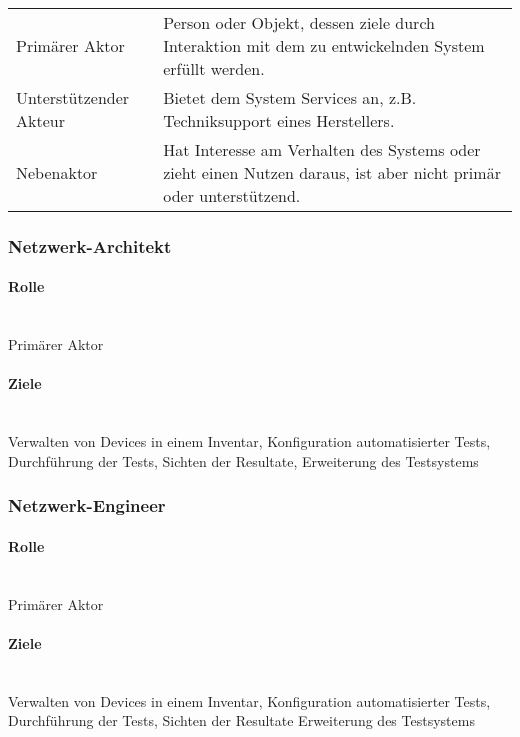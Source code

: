 \documentclass[
	ngerman,
	toc=listof, %
	toc=bibliography, %
	footnotes=multiple, %
	parskip=half, %
	numbers=noendperiod %
]{scrartcl}
\begin{document}
		\begin{tabularx}{\textwidth}{lX}
			\toprule
				Primärer Aktor & Person oder Objekt, dessen ziele durch Interaktion mit dem zu entwickelnden System erfüllt werden.\\
				Unterstützender Akteur & Bietet dem System Services an, z.B. Techniksupport eines Herstellers.\\
				Nebenaktor & Hat Interesse am Verhalten des Systems oder zieht einen Nutzen daraus, ist aber nicht primär oder unterstützend. \\
			\bottomrule
		\end{tabularx}

		\subsubsection{Netzwerk-Architekt}
		
			\paragraph{Rolle} ~\\
			Primärer Aktor 

			\paragraph{Ziele} ~\\
			Verwalten von Devices in einem Inventar, 
			Konfiguration automatisierter Tests, 
			Durchführung der Tests, 
			Sichten der Resultate,
			Erweiterung des Testsystems
			
		\subsubsection{Netzwerk-Engineer}
		
			\paragraph{Rolle} ~\\
			Primärer Aktor 

			\paragraph{Ziele} ~\\
			Verwalten von Devices in einem Inventar, 
			Konfiguration automatisierter Tests, 
			Durchführung der Tests, 
			Sichten der Resultate
			Erweiterung des Testsystems
			\newpage
\end{document}
